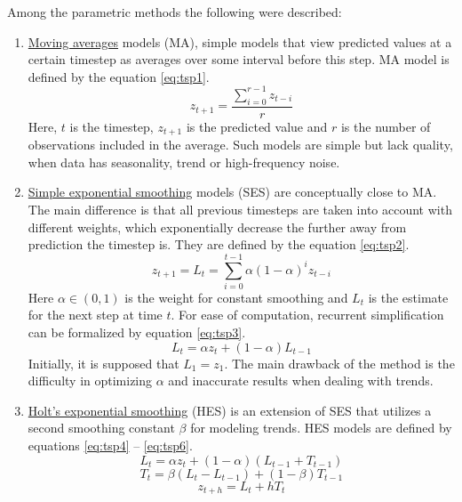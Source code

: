 \documentclass[3p,times,procedia]{elsarticle}
\begin{document}
Among the parametric methods the following were described:
\begin{enumerate}
\item \underline{Moving averages} models (MA), simple models that view predicted values at a certain timestep as averages over some interval before this step. MA model is defined by the equation \ref{eq:tsp1}.
\begin{equation} \label{eq:tsp1}
z_{t+1} = \frac{\sum\limits_{i=0}^{r-1}z_{t-i}}{r}
\end{equation}
Here, $t$ is the timestep, $z_{t+1}$ is the predicted value and $r$ is the number of observations included in the average. Such models are simple but lack quality, when data has seasonality, trend or high-frequency noise.
\item \underline{Simple exponential smoothing} models (SES) are conceptually close to MA. The main difference is that all previous timesteps are taken into account with different weights, which exponentially decrease the further away from prediction the timestep is. They are defined by the equation \ref{eq:tsp2}.
\begin{equation} \label{eq:tsp2}
z_{t+1} = L_t = \sum_{i=0}^{t-1} \alpha (1-\alpha)^i z_{t-i}
\end{equation}
Here $\alpha \in (0,1)$ is the weight for constant smoothing and $L_t$ is the estimate for the next step at time $t$. For ease of computation, recurrent simplification can be formalized by equation \ref{eq:tsp3}.
\begin{equation} \label{eq:tsp3}
L_t = \alpha z_t + (1-\alpha) L_{t-1}
\end{equation}
Initially, it is supposed that $L_1 = z_1$. The main drawback of the method is the difficulty in optimizing $\alpha$ and inaccurate results when dealing with trends.
\item \underline{Holt's exponential smoothing} (HES) is an extension of SES that utilizes a second smoothing constant $\beta$ for modeling trends. HES models are defined by equations \ref{eq:tsp4} -- \ref{eq:tsp6}.
\begin{equation} \label{eq:tsp4}
L_t = \alpha z_t + (1-\alpha) (L_{t-1} + T_{t-1})
\end{equation}
\begin{equation} \label{eq:tsp5}
T_t = \beta (L_t - L_{t-1}) + (1-\beta) T_{t-1}
\end{equation}
\begin{equation} \label{eq:tsp6}
z_{t+h} = L_t + hT_t
\end{equation}

\end{enumerate}
\end{document}
